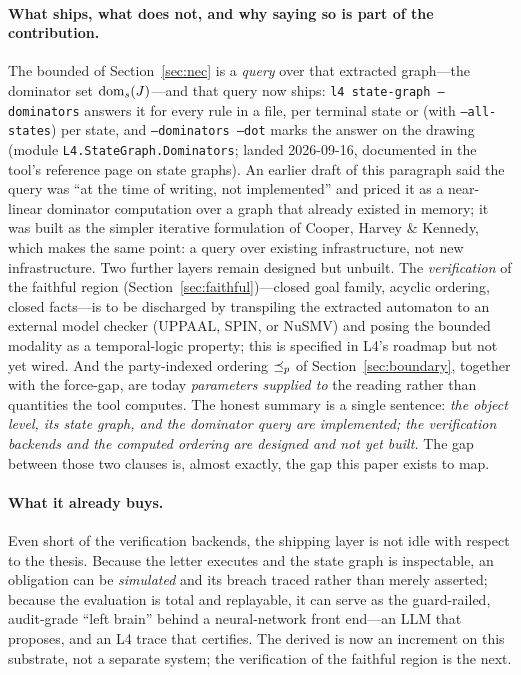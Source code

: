 \paragraph{What ships, what does not, and why saying so is part of the contribution.} The
bounded \MUST{} of Section~\ref{sec:nec} is a \emph{query} over that extracted graph---the
dominator set $\operatorname{dom}_s(J)$---and that query now ships: \texttt{l4 state-graph --dominators}
answers it for every rule in a file, per terminal state or (with \texttt{--all-states}) per state, and
\texttt{--dominators --dot} marks the answer on the drawing (module
\texttt{L4.StateGraph.Dominators}; landed 2026-09-16, documented in the tool's reference page
on state graphs). An earlier draft of this paragraph said the query was ``at the time of
writing, not implemented'' and priced it as a near-linear dominator computation  over a graph that already existed in memory; it was built as the simpler
iterative formulation of Cooper, Harvey \& Kennedy, which makes the same point: a query over
existing infrastructure, not new infrastructure. Two further layers remain designed but
unbuilt. The
\emph{verification} of the faithful region (Section~\ref{sec:faithful})---closed goal
family, acyclic ordering, closed facts---is to be discharged by transpiling the extracted
automaton to an external model checker (UPPAAL, SPIN, or NuSMV) and posing the bounded
modality as a temporal-logic property; this is specified in L4's roadmap but not yet
wired. And the party-indexed ordering $\preceq_{p}$ of Section~\ref{sec:boundary}, together with
the force-gap, are today \emph{parameters supplied to} the reading rather than quantities the
tool computes. The honest summary is a single sentence: \emph{the object level, its state
graph, and the dominator query are implemented; the verification backends and the computed
ordering are designed and not yet built.} The gap between those two clauses is, almost exactly,
the gap this paper exists to map.

\paragraph{What it already buys.} Even short of the verification backends, the shipping layer is
not idle with respect to the thesis. Because the letter executes and the state graph is
inspectable, an obligation can be \emph{simulated} and its breach traced rather than merely
asserted; because the evaluation is total and replayable, it can serve as the
guard-railed, audit-grade ``left brain'' behind a neural-network front end---an LLM that
proposes, and an L4 trace that certifies. The derived \MUST{} is now an increment on this
substrate, not a separate system; the verification of the faithful region is the next.

